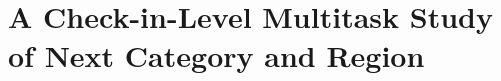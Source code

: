 \chapter[A Check-in-Level Multitask Study of Next Category and Region]{A Check-in-Level Multitask Study of Next Category and Region}
\label{ch:mobiwac}

